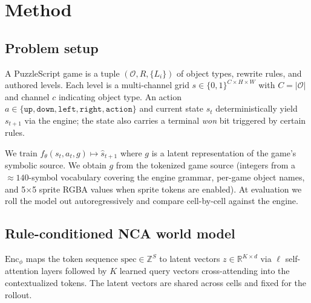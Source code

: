 \section{Method}
\label{sec:method}

\subsection{Problem setup}

A PuzzleScript game is a tuple $(\mathcal{O}, R, \{L_i\})$ of object
types, rewrite rules, and authored levels. Each level is a
multi-channel grid $s \in \{0,1\}^{C \times H \times W}$ with
$C = |\mathcal{O}|$ and channel $c$ indicating object type. An
action $a \in \{\texttt{up}, \texttt{down}, \texttt{left}, \texttt{right},
\texttt{action}\}$ and current state $s_t$ deterministically yield
$s_{t+1}$ via the engine; the state also carries a terminal \emph{won}
bit triggered by certain rules.

We train $f_\theta(s_t, a_t, g) \mapsto \widehat{s}_{t+1}$ where $g$
is a latent representation of the game's symbolic source. We obtain
$g$ from the tokenized game source (integers from a $\approx
140$-symbol vocabulary covering the engine grammar, per-game object
names, and 5$\times$5 sprite RGBA values when sprite tokens are
enabled). At evaluation we roll the model out autoregressively and
compare cell-by-cell against the engine.

\subsection{Rule-conditioned NCA world model}

$\mathrm{Enc}_\phi$ maps the token sequence $\mathrm{spec} \in \mathbb{Z}^{S}$ to latent vectors $z \in \mathbb{R}^{K \times d}$ via $\ell$ self-attention layers followed by $K$ learned query vectors cross-attending into the contextualized tokens.
The latent vectors are shared across cells and fixed for the rollout.

